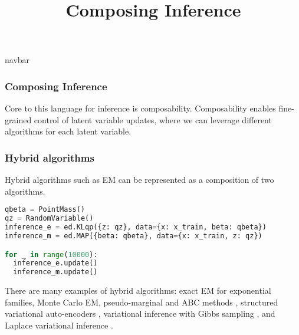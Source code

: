 \title{Composing Inference}

{{navbar}}

\subsubsection{Composing Inference}

Core to this language for inference is composability. Composability
enables fine-grained control of latent variable updates, where we can
leverage different algorithms for each latent variable.

\subsubsection{Hybrid algorithms}

Hybrid algorithms such as EM can be represented as a composition of two
algorithms.
\begin{lstlisting}[language=Python]
qbeta = PointMass()
qz = RandomVariable()
inference_e = ed.KLqp({z: qz}, data={x: x_train, beta: qbeta})
inference_m = ed.MAP({beta: qbeta}, data={x: x_train, z: qz})

for _ in range(10000):
  inference_e.update()
  inference_m.update()
\end{lstlisting}
There are many examples of hybrid algorithms:
exact EM for exponential families,
Monte Carlo EM,
pseudo-marginal and ABC methods \citep{andrieu2009pseudo},
structured variational auto-encoders \citep{johnson2016composing},
variational inference with Gibbs sampling \citep{wang2012truncation},
and Laplace variational inference \citep{wang2013variational}.




